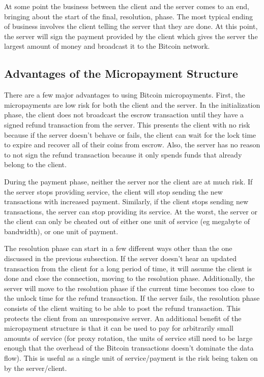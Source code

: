 At some point the business between the client and the server comes to an end, bringing about the start of the final, resolution, phase. The most typical ending of business involves the client telling the server that they are done. At this point, the server will sign the payment provided by the client which gives the server the largest amount of money and broadcast it to the Bitcoin network.

\subsection{Advantages of the Micropayment Structure}

There are a few major advantages to using Bitcoin micropayments. First, the micropayments are low risk for both the client and the server. In the initialization phase, the client does not broadcast the escrow transaction until they have a signed refund transaction from the server. This presents the client with no risk because if the server doesn't behave or fails, the client can wait for the lock time to expire and recover all of their coins from escrow. Also, the server has no reason to not sign the refund transaction because it only spends funds that already belong to the client.

During the payment phase, neither the server nor the client are at much risk. If the server stops providing service, the client will stop sending the new transactions with increased payment. Similarly, if the client stops sending new transactions, the server can stop providing its service. At the worst, the server or the client can only be cheated out of either one unit of service (eg megabyte of bandwidth), or one unit of payment.

The resolution phase can start in a few different ways other than the one discussed in the previous subsection. If the server doesn't hear an updated transaction from the client for a long period of time, it will assume the client is done and close the connection, moving to the resolution phase. Additionally, the server will move to the resolution phase if the current time becomes too close to the unlock time for the refund transaction. If the server fails, the resolution phase consists of the client waiting to be able to post the refund transaction. This protects the client from an unresponsive server. An additional benefit of the micropayment structure is that it can be used to pay for arbitrarily small amounts of service (for proxy rotation, the units of service still need to be large enough that the overhead of the Bitcoin transactions doesn't dominate the data flow). This is useful as a single unit of service/payment is the risk being taken on by the server/client.

